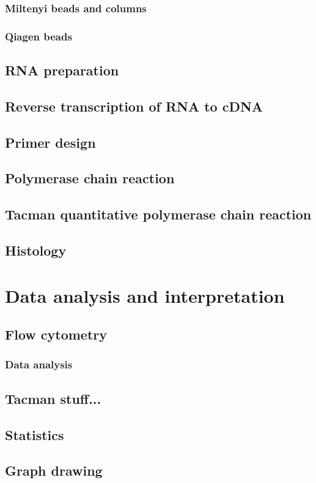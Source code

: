 \subsubsection{Miltenyi beads and columns}
\subsubsection{Qiagen beads}

\subsection{RNA preparation}
\subsection{Reverse transcription of RNA to cDNA}
\subsection{Primer design}
\subsection{Polymerase chain reaction}
\subsection{Tacman quantitative polymerase chain reaction}
\subsection{Histology}

\section{Data analysis and interpretation}
\subsection{Flow cytometry}
\subsubsection{Data analysis}
\subsection{Tacman stuff...}
\subsection{Statistics}
\subsection{Graph drawing}


